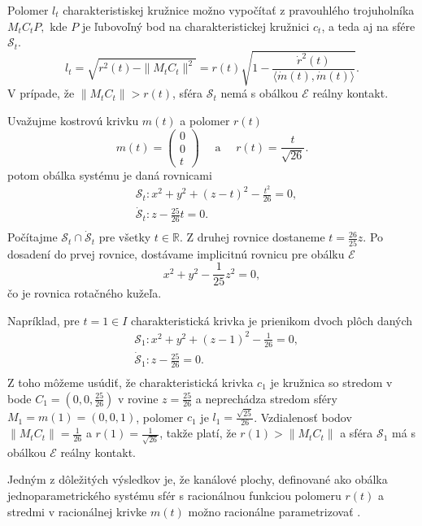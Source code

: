 Polomer $l_t$ charakteristiskej kružnice  možno vypočítať z pravouhlého trojuholníka $M_tC_tP,$ kde $P$ je ľubovoľný bod na charakteristickej kružnici $c_t$, a teda aj na sfére $\mathcal{S}_t.$
$$ l_t = \sqrt{r^2(t) - \|M_tC_t\|^2} = r(t) \sqrt{ 1 - \frac{\dot{r}^2(t)}{\langle \dot{m}(t), \dot{m}(t) \rangle}}. $$
V prípade, že $ \|M_tC_t\| > r(t)$, sféra $\mathcal{S}_t$ nemá s obálkou $\mathcal{E}$ reálny kontakt. 

\begin{example}
Uvažujme kostrovú krivku $m(t)$ a polomer $r(t)$
$$ 
m(t) = \begin{pmatrix} 0 \\ 0 \\ t \end{pmatrix} \quad \text{ a } \quad r(t) = \frac{t}{\sqrt{26}}.
$$
potom obálka systému je daná rovnicami
\begin{align*}
&\mathcal{S}_t \colon x^2 + y^2 + (z - t)^2 - \frac{t^2}{26} = 0, \\
&\mathcal{\dot{S}}_t \colon z - \frac{25}{26}t = 0. \\
\end{align*}
Počítajme $ \mathcal{S}_t \cap \mathcal{\dot{S}}_t $ pre všetky $t \in \mathbb{R}.$ Z druhej rovnice dostaneme $t = \frac{26}{25}z$. Po dosadení do prvej rovnice, dostávame implicitnú rovnicu pre obálku $\mathcal{E}$
$$
x^2 + y^2 - \frac{1}{25}z^2 = 0,
$$
čo je rovnica rotačného kužeľa.

Napríklad, pre $t = 1 \in I$ charakteristická krivka je prienikom dvoch plôch daných
\begin{align*}
&\mathcal{S}_1 \colon x^2 + y^2 + (z - 1)^2 - \frac{1}{26} = 0, \\
&\mathcal{\dot{S}}_1 \colon z - \frac{25}{26} = 0. \\
\end{align*}
Z toho môžeme usúdiť, že charakteristická krivka $c_1$ je kružnica so stredom v bode $C_1 = (0, 0, \frac{25}{26})$ v rovine $z = \frac{25}{26}$ a neprechádza stredom sféry $M_1 = m(1) = (0,0,1)$, polomer $c_1$ je $l_{1} = \frac{\sqrt{25}}{26}$. Vzdialenosť bodov $ \|M_tC_t\| = \frac{1}{26}$ a $r(1)= \frac{1}{\sqrt{26}}$, takže platí, že $r(1) > \|M_tC_t\|$ a sféra $\mathcal{S}_1$ má s obálkou $\mathcal{E}$ reálny kontakt.
\end{example}

Jedným z dôležitých výsledkov je, že kanálové plochy, definované ako obálka jednoparametrického systému sfér s racionálnou funkciou polomeru $r(t)$ a stredmi v racionálnej krivke $m(t)$ možno racionálne parametrizovať \cite{Pet97}.

